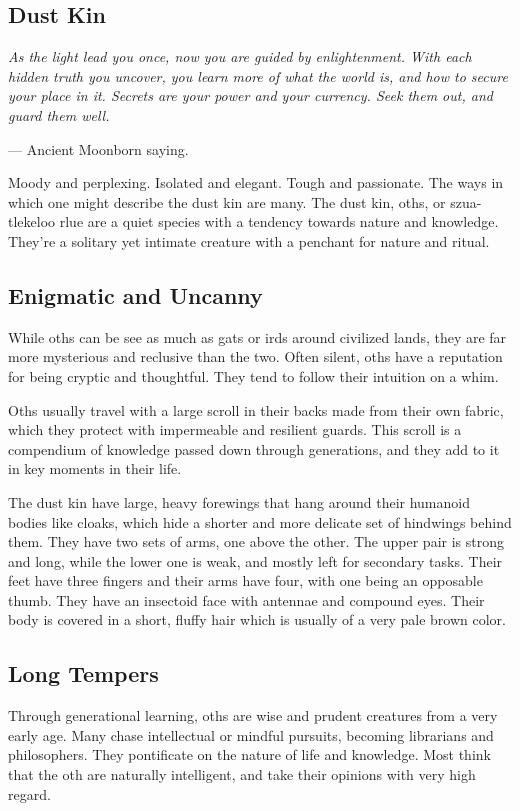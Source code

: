 \begin{linenumbers}

\section{Dust Kin}
\textit{As the light lead you once, now you are guided by enlightenment.
With each hidden truth you uncover, you learn more of what the world is, and how to secure your place in it.
Secrets are your power and your currency.
Seek them out, and guard them well.}

\hspace*{\fill} --- Ancient Moonborn saying.

Moody and perplexing.
Isolated and elegant.
Tough and passionate.
The ways in which one might describe the dust kin are many.
The dust kin, oths, or szua-tlekeloo rlue are a quiet species with a tendency towards nature and knowledge.
They're a solitary yet intimate creature with a penchant for nature and ritual.

\subsection*{Enigmatic and Uncanny}
While oths can be see as much as gats or irds around civilized lands, they are far more mysterious and reclusive than the two.
Often silent, oths have a reputation for being cryptic and thoughtful.
They tend to follow their intuition on a whim.

Oths usually travel with a large scroll in their backs made from their own fabric, which they protect with impermeable and resilient guards.
This scroll is a compendium of knowledge passed down through generations, and they add to it in key moments in their life.

The dust kin have large, heavy forewings that hang around their humanoid bodies like cloaks, which hide a shorter and more delicate set of hindwings behind them.
They have two sets of arms, one above the other.
The upper pair is strong and long, while the lower one is weak, and mostly left for secondary tasks.
Their feet have three fingers and their arms have four, with one being an opposable thumb.
They have an insectoid face with antennae and compound eyes.
Their body is covered in a short, fluffy hair which is usually of a very pale brown color.

\subsection*{Long Tempers}
Through generational learning, oths are wise and prudent creatures from a very early age.
Many chase intellectual or mindful pursuits, becoming librarians and philosophers.
They pontificate on the nature of life and knowledge.
Most think that the oth are naturally intelligent, and take their opinions with very high regard.


\end{linenumbers}
